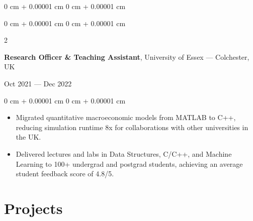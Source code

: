 \documentclass[6pt, letterpaper]{article}
\newenvironment{highlights}{
    \begin{itemize}[
        topsep=0.03 cm,
        parsep=0.03 cm,
        partopsep=0pt,
        itemsep=0pt,
        leftmargin=0 cm + 10pt
    ]
}{
    \end{itemize}
} %
\newenvironment{onecolentry}{
    \begin{adjustwidth}{
        0 cm + 0.00001 cm
    }{
        0 cm + 0.00001 cm
    }
}{
    \end{adjustwidth}
} %
\newenvironment{twocolentry}[2][]{
    \onecolentry
    \def\secondColumn{#2}
    \setcolumnwidth{\fill, 4.5 cm}
    \begin{paracol}{2}
}{
    \switchcolumn \raggedleft \secondColumn
    \end{paracol}
    \endonecolentry
} %
\begin{document}
\begin{onecolentry}
\begin{highlights}

        \end{highlights}
        \end{onecolentry}

        \begin{twocolentry}{Oct 2021 --- Dec 2022}
        \textbf{Research Officer \& Teaching Assistant}, University of Essex --- Colchester, UK
        \end{twocolentry}

        \begin{onecolentry}
        \begin{highlights}
        \item Migrated quantitative macroeconomic models from MATLAB to C++, reducing simulation runtime 8x for collaborations with other universities in the UK.
        \item Delivered lectures and labs in Data Structures, C/C++, and Machine Learning to 100+ undergrad and postgrad students, achieving an average student feedback score of 4.8/5.
        \end{highlights}
        \end{onecolentry}


    \section{Projects}
\end{document}
